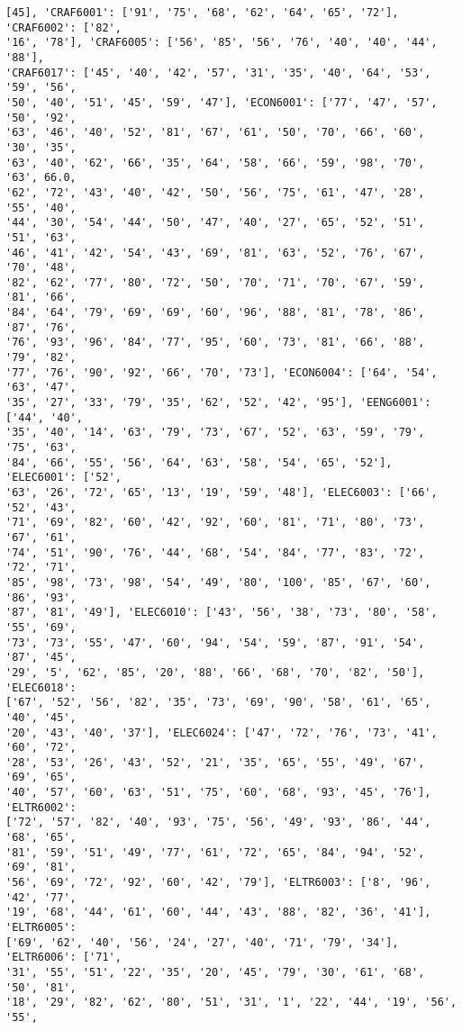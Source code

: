 \documentclass[11pt]{article}
\begin{document}
\begin{Verbatim}[commandchars=\\\{\}]
[45], 'CRAF6001': ['91', '75', '68', '62', '64', '65', '72'], 'CRAF6002': ['82',
'16', '78'], 'CRAF6005': ['56', '85', '56', '76', '40', '40', '44', '88'],
'CRAF6017': ['45', '40', '42', '57', '31', '35', '40', '64', '53', '59', '56',
'50', '40', '51', '45', '59', '47'], 'ECON6001': ['77', '47', '57', '50', '92',
'63', '46', '40', '52', '81', '67', '61', '50', '70', '66', '60', '30', '35',
'63', '40', '62', '66', '35', '64', '58', '66', '59', '98', '70', '63', 66.0,
'62', '72', '43', '40', '42', '50', '56', '75', '61', '47', '28', '55', '40',
'44', '30', '54', '44', '50', '47', '40', '27', '65', '52', '51', '51', '63',
'46', '41', '42', '54', '43', '69', '81', '63', '52', '76', '67', '70', '48',
'82', '62', '77', '80', '72', '50', '70', '71', '70', '67', '59', '81', '66',
'84', '64', '79', '69', '69', '60', '96', '88', '81', '78', '86', '87', '76',
'76', '93', '96', '84', '77', '95', '60', '73', '81', '66', '88', '79', '82',
'77', '76', '90', '92', '66', '70', '73'], 'ECON6004': ['64', '54', '63', '47',
'35', '27', '33', '79', '35', '62', '52', '42', '95'], 'EENG6001': ['44', '40',
'35', '40', '14', '63', '79', '73', '67', '52', '63', '59', '79', '75', '63',
'84', '66', '55', '56', '64', '63', '58', '54', '65', '52'], 'ELEC6001': ['52',
'63', '26', '72', '65', '13', '19', '59', '48'], 'ELEC6003': ['66', '52', '43',
'71', '69', '82', '60', '42', '92', '60', '81', '71', '80', '73', '67', '61',
'74', '51', '90', '76', '44', '68', '54', '84', '77', '83', '72', '72', '71',
'85', '98', '73', '98', '54', '49', '80', '100', '85', '67', '60', '86', '93',
'87', '81', '49'], 'ELEC6010': ['43', '56', '38', '73', '80', '58', '55', '69',
'73', '73', '55', '47', '60', '94', '54', '59', '87', '91', '54', '87', '45',
'29', '5', '62', '85', '20', '88', '66', '68', '70', '82', '50'], 'ELEC6018':
['67', '52', '56', '82', '35', '73', '69', '90', '58', '61', '65', '40', '45',
'20', '43', '40', '37'], 'ELEC6024': ['47', '72', '76', '73', '41', '60', '72',
'28', '53', '26', '43', '52', '21', '35', '65', '55', '49', '67', '69', '65',
'40', '57', '60', '63', '51', '75', '60', '68', '93', '45', '76'], 'ELTR6002':
['72', '57', '82', '40', '93', '75', '56', '49', '93', '86', '44', '68', '65',
'81', '59', '51', '49', '77', '61', '72', '65', '84', '94', '52', '69', '81',
'56', '69', '72', '92', '60', '42', '79'], 'ELTR6003': ['8', '96', '42', '77',
'19', '68', '44', '61', '60', '44', '43', '88', '82', '36', '41'], 'ELTR6005':
['69', '62', '40', '56', '24', '27', '40', '71', '79', '34'], 'ELTR6006': ['71',
'31', '55', '51', '22', '35', '20', '45', '79', '30', '61', '68', '50', '81',
'18', '29', '82', '62', '80', '51', '31', '1', '22', '44', '19', '56', '55',

\end{Verbatim}
\end{document}
